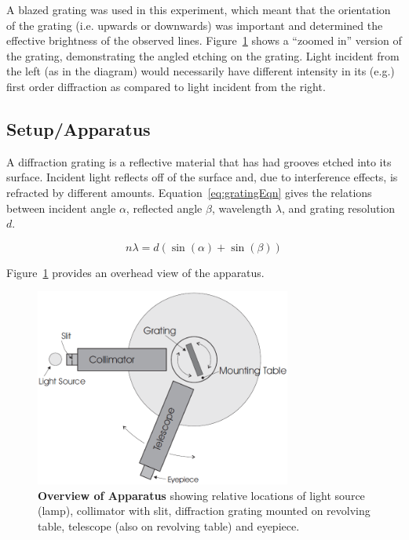 \documentclass[paper=a4, fontsize=11pt]{scrartcl} %
\numberwithin{equation}{section}
\numberwithin{figure}{section}
\numberwithin{table}{section}
\begin{document}
A blazed grating was used in this experiment, which meant that the orientation of the grating (i.e. upwards or downwards) was important and determined the effective brightness of the observed lines. Figure~\ref{fig:diagram1} shows a ``zoomed in'' version of the grating, demonstrating the angled etching on the grating. Light incident from the left (as in the diagram) would necessarily have different intensity in its (e.g.) first order diffraction as compared to light incident from the right.


\subsection{Setup/Apparatus}

A diffraction grating is a reflective material that has had grooves etched into its surface. Incident light reflects off of the surface and, due to interference effects, is refracted by different amounts. Equation~\ref{eq:gratingEqn} gives the relations between incident angle $\alpha$, reflected angle $\beta$, wavelength $\lambda$, and grating resolution $d$.

\begin{equation} \label{eq:gratingEqn}
n \lambda = d ( \sin(\alpha) + \sin(\beta))
\end{equation}

Figure~\ref{fig:diagram1} provides an overhead view of the apparatus.


\begin{figure}[H] \begin{center}
  \includegraphics[height=65mm]{diagram1.png}
  \caption{\textbf{Overview of Apparatus} showing relative locations of light source (lamp), collimator with slit, diffraction grating mounted on revolving table, telescope (also on revolving table) and eyepiece.\cite{writeup}}
  \label{fig:diagram1}
\end{center} \end{figure}
\end{document}
